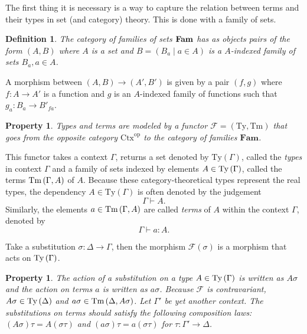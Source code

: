 \documentclass[12pt,a4paper,twoside,xetex]{book} %
\newcommand{\keyword}[1]{\emph{#1}\index{#1}}
\newtheorem{definition}[theorem]{Definition}
\newtheorem{property}[theorem]{Property}
\begin{document}
The first thing it is necessary is a way to capture the relation between terms 
and their types in set (and category) theory. This is done with a family of 
sets. 

\begin{definition}
The category of  \keyword{families of sets} $ \text{\textbf{Fam}}$ has as 
objects pairs of the form $\left(A,B\right)$ where $A$ is a set and 
$B=\left(B_{a}\mid a\in A\right)$ is a $A$-indexed family of sets $B_{a},a\in 
A$. 
\end{definition}

A morphism between $\left(A,B\right)\rightarrow\left(A',B'\right)$ is given by 
a pair $\left(f,g\right)$ where $f:A\rightarrow A'$ is a function and $g$ is an 
$A$-indexed family of functions such that $g_{a}:B_{a}\rightarrow B'_{fa}$.


\begin{property}\label{type_functor} Types and terms are modeled by a functor 
$\mathcal{F}=\left(\text{Ty},\text{Tm}\right)$ that goes from the opposite 
category $\text{Ctx}^{\text{op}}$ to the category of families $\textbf{Fam}$.
\end{property}

This functor takes a context $\Gamma$, returns a set denoted by 
$\text{Ty}\left(\Gamma\right)$, called the \keyword{types} in context $\Gamma$ 
and a family of sets indexed by elements $A\in\text{Ty}\left(\Gamma\right)$, called the terms 
$\text{Tm}\left(\Gamma,A\right)$ of $A$. Because these category-theoretical types represent the 
real types, the dependency $A \in \text{Ty}(\Gamma)$ is often denoted by the 
judgement $$\Gamma\vdash A.$$ Similarly, the elements $a\in\text{Tm}\left(\Gamma,A\right)$ are 
called \keyword{terms} of $A$ within the context $\Gamma$, denoted by 
$$\Gamma\vdash a:A.$$

 Take a substitution $\sigma:\Delta\rightarrow\Gamma$, then the morphism 
$\mathcal{F}(\sigma)$ is a morphism that acts on $\text{Ty}\left(\Gamma\right)$. 

\begin{property}\label{composition_laws}
The action of a substitution on a type $A\in\text{Ty}\left(\Gamma\right)$ is written as 
$A\sigma$ and the action on terms $a$ is written as $a\sigma$. Because 
$\mathcal{F}$ is contravariant, $A \sigma\in \text{Ty}\left(\Delta\right)$ and $a \sigma \in 
\text{Tm}\left(\Delta,A \sigma\right)$. Let $\Gamma '$ be yet another context. The 
substitutions on terms should satisfy
the following composition laws: 
$\left(A\sigma\right)\tau=A\left(\sigma\tau\right)$
and $\left(a\sigma\right)\tau=a\left(\sigma\tau\right)$ for 
$\tau:\Gamma'\rightarrow\Delta$.
\end{property}
\end{document}
